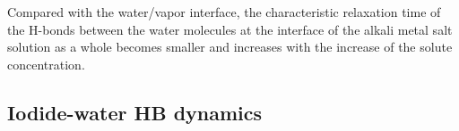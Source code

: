 Compared with the water/vapor interface, the characteristic relaxation time of the H-bonds between the water molecules 
at the interface of the alkali metal salt solution as a whole becomes smaller and increases with the increase of the solute concentration.


\subsection{Iodide-water HB dynamics}\label{PARA_ION-WAT}

